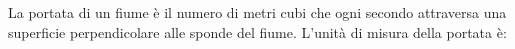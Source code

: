 La portata di un fiume è il numero di metri cubi che ogni 
secondo attraversa una superficie perpendicolare alle sponde 
del fiume. L'unità di misura della portata è: